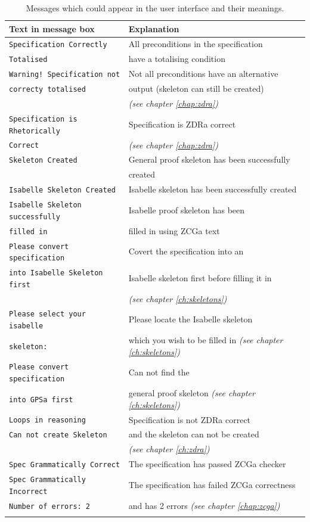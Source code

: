 {\def\arraystretch{0.5}\tabcolsep=0.5pt
\begin{longtable}[H]{|l | l |}
\hline
\textbf{Text in message box} & \textbf{Explanation} \\
\hline
\hline
\verb|Specification Correctly| & All preconditions in the specification\\
\verb|Totalised| & have a totalising condition  \\
\hline
\verb|Warning! Specification not| & Not all preconditions have an alternative \\
\verb|correcty totalised| & output (skeleton can still be created) \\
& \textit{(see chapter \ref{chap:zdra})} \\
\hline
\verb|Specification is Rhetorically| & Specification is ZDRa correct \\
\verb|Correct| & \textit{(see chapter \ref{chap:zdra})} \\
\hline
\verb|Skeleton Created| & General proof skeleton has been successfully \\
& created \\
\hline
\verb|Isabelle Skeleton Created| & Isabelle skeleton has been successfully created \\
\hline
\verb|Isabelle Skeleton successfully| & Isabelle proof skeleton has been \\
\verb|filled in| & filled in using ZCGa text \\
\hline
\verb|Please convert specification| & Covert the specification into an  \\
\verb|into Isabelle Skeleton first| & Isabelle skeleton first before filling it in \\
& \textit{(see chapter \ref{ch:skeletons})} \\
\hline
\verb|Please select your isabelle| & Please locate the Isabelle skeleton\\
\verb|skeleton:| & which you wish to be filled in \textit{(see chapter \ref{ch:skeletons})}\\
\hline
\verb|Please convert specification| & Can not find the \\
\verb|into GPSa first| & general proof skeleton \textit{(see chapter \ref{ch:skeletons})}\\
\hline
\verb|Loops in reasoning| & Specification is not ZDRa correct \\
\verb|Can not create Skeleton| & and the skeleton can not be created \\
& \textit{(see chapter \ref{ch:zdra})}\\
\hline
\verb|Spec Grammatically Correct| & The specification has passed ZCGa checker \\
\hline
\verb|Spec Grammatically Incorrect|& The specification has failed ZCGa correctness\\
\verb|Number of errors: 2| & and has 2 errors \textit{(see chapter \ref{chap:zcga})}\\
\hline
\caption{Messages which could appear in the user interface and their meanings.}
\label{tab:uimessages}
\end{longtable}
}

